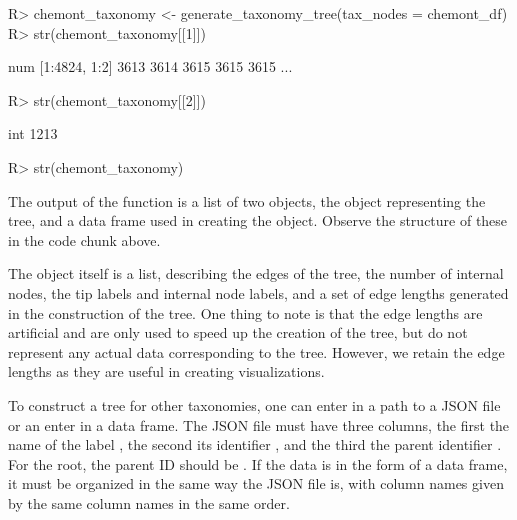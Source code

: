 \documentclass[article]{jss}
\newcommand{\fct}[1]{\code{#1()}}
\begin{document}
%
\begin{Schunk}
\begin{Sinput}
R> chemont_taxonomy <- generate_taxonomy_tree(tax_nodes = chemont_df)
R> str(chemont_taxonomy[[1]])
\end{Sinput}
\begin{Soutput}
 num [1:4824, 1:2] 3613 3614 3615 3615 3615 ...
\end{Soutput}
\begin{Sinput}
R> str(chemont_taxonomy[[2]])
\end{Sinput}
\begin{Soutput}
 int 1213
\end{Soutput}
\begin{Sinput}
R> str(chemont_taxonomy)
\end{Sinput}
\end{Schunk}
%

The output of the \fct{generate\_taxonomy} function is a list of two objects, the  object representing the tree, and a data frame used in creating the  object. Observe the structure of these in the code chunk above.

The  object itself is a list, describing the edges of the tree, the number of internal nodes, the tip labels and internal node labels, and a set of edge lengths generated in the construction of the tree. One thing to note is that the edge lengths are artificial and are only used to speed up the creation of the tree, but do not represent any actual data corresponding to the tree. However, we retain the edge lengths as they are useful in creating visualizations.

To construct a tree for other taxonomies, one can enter in a path to a JSON file or an enter in a data frame. The JSON file must have three columns, the first the name of the label , the second its identifier , and the third the parent identifier . For the root, the parent ID should be . If the data is in the form of a data frame, it must be organized in the same way the JSON file is, with column names given by the same column names in the same order.
\end{document}
